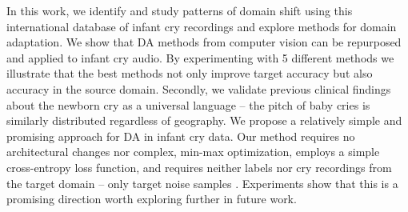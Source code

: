 \documentclass{article}
\begin{document}
In this work, we identify and study patterns of domain shift using this international database of infant cry recordings and explore methods for domain adaptation. We show that DA methods from computer vision can be repurposed and applied to infant cry audio. By experimenting with 5 different methods we illustrate that the best methods not only improve target accuracy but also accuracy in the source domain. Secondly, we validate previous clinical findings about the newborn cry as a universal language -- the pitch of baby cries is similarly distributed regardless of geography. We propose a relatively simple and promising approach for DA in infant cry data. Our method requires no architectural changes nor complex, min-max optimization, employs a simple cross-entropy loss function, and requires neither labels nor cry recordings from the target domain -- only target noise samples \cite{NANNI2020101084}. Experiments show that this is a promising direction worth exploring further in future work.

\end{document}
